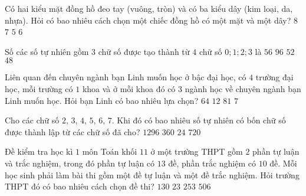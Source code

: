 \begin{ex}%
	Có hai kiểu mặt đồng hồ đeo tay (vuông, tròn) và có ba kiểu dây (kim loại, da, nhựa). Hỏi có bao nhiêu cách chọn một chiếc đồng hồ có một mặt và một dây?
	\choice
	{$8$}
	{$7$}
	{$5$}
	{\True $6$}
\end{ex}

\begin{ex}%
	Số các số tự nhiên gồm $3$ chữ số được tạo thành từ $4$ chữ số $0;1;2;3$ là
	\choice
	{$56$}
	{$96$}
	{$52$}
	{\True $48$}
\end{ex}

\begin{ex}%
	Liên quan đến chuyên ngành bạn Linh muốn học ở bậc đại học, có $4$ trường đại học, mỗi trường có $1$ khoa và ở mỗi khoa đó có $3$ ngành học về chuyên ngành bạn Linh muốn học. Hỏi bạn
	Linh có bao nhiêu lựa chọn?
	\choice
	{$64$}
	{\True $12$}
	{$81$}
	{$7$}
\end{ex}

\begin{ex}%
	Cho các chữ số $2,\,3,\,4,\,5,\,6,\,7.$ Khi đó có bao nhiêu số tự nhiên có bốn chữ số được thành lập từ các chữ số đã cho?
	\choice
	{$1296$}
	{\True $360$}
	{$24$}
	{$720$}
\end{ex}

\begin{ex}%
	Đề kiểm tra học kì $1$ môn Toán khối $11$ ở một trường THPT gồm $2$ phần tự luận và trắc nghiệm, trong đó phần tự luận có $13$ đề, phần trắc nghiệm có $10$ đề. Mỗi học sinh phải làm bài thi gồm một đề tự luận và một đề trắc nghiệm. Hỏi trường THPT đó có bao nhiêu cách chọn đề thi?
	\choice
	{\True $130$}
	{ $23$}
	{$253$}
	{$506$}
\end{ex}


